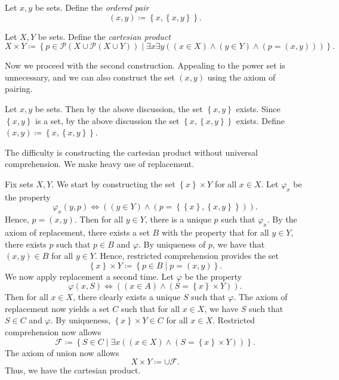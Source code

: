 \begin{definition}\label{dfn:pair}
	Let $x,y$ be sets. Define the \emph{ordered pair}
	\[
		(x,y) \coloneqq \left\{ x,\left\{ x,y \right\}  \right\} 
	.\]
\end{definition}
\begin{definition}\label{dfn:product1}
	Let $X,Y$ be sets. Define the \emph{cartesian product}
	\[
		X\times Y \coloneqq \left\{ p\in \mathcal{P} (X \cup \mathcal{P} (X \cup Y)) \mid \exists x\exists y((x\in X)\land (y\in Y)\land (p=(x,y))) \right\} 
	.\]
\end{definition}


Now we proceed with the second construction. Appealing to the power set is unnecessary, and we can also construct the set $(x,y)$ using the axiom of pairing.

\begin{construction}
	Let $x,y$ be sets. Then by the above discussion, the set $\left\{ x,y \right\} $ exists. Since $\left\{ x,y \right\} $ is a set, by the above discussion the set $\left\{ x,\left\{ x,y \right\}  \right\} $ exists. Define $(x,y) \coloneqq \left\{ x,\left\{ x,y \right\}  \right\} $.
\end{construction}

The difficulty is constructing the cartesian product without universal comprehension. We make heavy use of replacement.
\begin{construction}
	Fix sets $X,Y$. We start by constructing the set $\left\{ x \right\} \times Y$ for all $x\in X$. Let $\varphi_x$ be the property
	\[
		\varphi_x(y,p) \iff \left( (y\in Y)\land (p=\left\{ \left\{ x \right\} ,\left\{ x,y \right\}  \right\})  \right) 
	.\]
	Hence, $p=(x,y)$. Then for all $y\in Y$, there is a unique $p$ such that $\varphi _x$. By the axiom of replacement, there exists a set $B$ with the property that for all $y\in Y$, there exists $p$ such that $p\in B$ and $\varphi $. By uniqueness of $p$, we have that $(x,y)\in B$ for all $y\in Y$. Hence, restricted comprehension provides the set
	\[
		\left\{ x \right\} \times Y \coloneqq \left\{ p\in B \mid p=(x,y) \right\} 
	.\]
	We now apply replacement a second time. Let $\varphi $ be the property
	\[
		\varphi (x,S) \iff \left( (x\in A)\land (S=\left\{ x \right\} \times Y) \right) 
	.\]
	Then for all $x\in X$, there clearly exists a unique $S$ such that $\varphi $. The axiom of replacement now yields a set $C$ such that for all $x\in X$, we have $S$ such that $S\in C$ and $\varphi $. By uniqueness, $\left\{ x \right\} \times Y\in C$ for all $x\in X$. Restricted comprehension now allows
	\[
		\mathcal{F} \coloneqq \left\{ S\in C \mid \exists x((x\in X)\land (S=\left\{ x \right\} \times Y)) \right\} 
	.\]
	The axiom of union now allows
	\[
		X\times Y \coloneqq \cup \mathcal{F} 
	.\]
	Thus, we have the cartesian product.
\end{construction}

